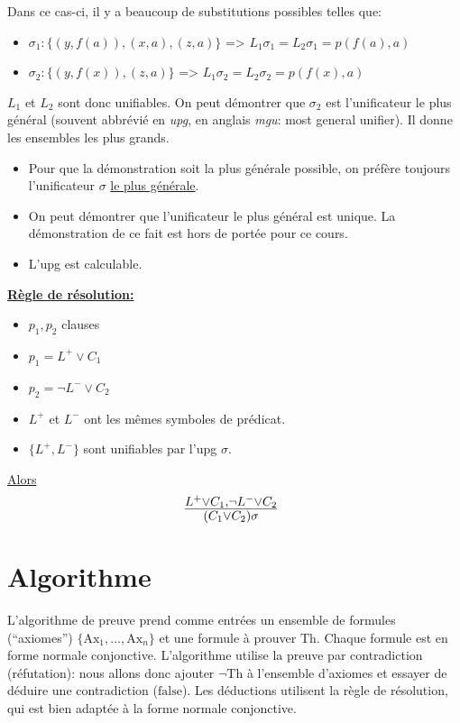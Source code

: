 {Dans ce cas-ci, il y a beaucoup de substitutions possibles telles que:
\begin{itemize}
  \item $\sigma_1 : \big\{ (y, f(a)), (x,a), (z,a) \big\}$ => $L_1 \sigma_1 = L_2 \sigma_1 = p(f(a), a)$
  \item $\sigma_2 : \big\{ (y, f(x)), (z,a) \big\}$ \hspace{11 mm}=> $L_1 \sigma_2 = L_2 \sigma_2 = p(f(x), a)$
\end{itemize}
$L_1$ et $L_2$ sont donc unifiables.
On peut démontrer que $\sigma_2$ est l'unificateur le plus général (souvent abbrévié en {\em upg},
en anglais {\em mgu}: most general unifier).
Il donne les ensembles les plus grands.\\

\begin{itemize}
  \item Pour que la démonstration soit la plus générale possible,
  on préfère toujours l'unificateur $\sigma$ \underline{le plus générale}.
  \item On peut démontrer que l'unificateur le plus général est unique.
  La démonstration de ce fait est hors de portée pour ce cours.
  \item L'upg est calculable.
\end{itemize}

\vspace{5 mm}
\textbf{\underline{Règle de résolution:}}
\begin{itemize}
  \item $p_1, p_2$ clauses
  \item $p_1 = L^{+} \vee C_1$
  \item $p_2 = \neg L^{-} \vee C_2$
  \item $ L^{+}$ et $L^{-}$ ont les mêmes symboles de prédicat.
  \item $ \big\{L^{+}, L^{-}\big\}$ sont unifiables par l'upg $\sigma$.
\end{itemize}

\underline{Alors} $$ \mbox{\Large $\frac{L^{+} \vee C_1, \neg L^{-} \vee C_2}{(C_1 \vee C_2)\sigma}$ } $$

\section{Algorithme}

L'algorithme de preuve prend comme entrées un ensemble
de formules (``axiomes'') $\{ \mathrm{Ax}_1, ..., \mathrm{Ax}_n \}$
et une formule à prouver $\mathrm{Th}$.
Chaque formule est en forme normale conjonctive.
L'algorithme utilise la preuve par contradiction (réfutation):
nous allons donc ajouter $\neg \mathrm{Th}$ à l'ensemble d'axiomes
et essayer de déduire une contradiction ($\mathrm{false}$).
Les déductions utilisent la règle de résolution, qui est bien adaptée
à la forme normale conjonctive.

}
